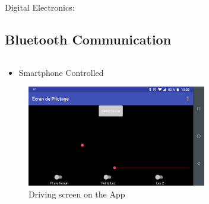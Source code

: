 \documentclass{beamer}
\begin{document}
\begin{frame}{Digital Electronics:}
		\subsection[Bluetooth]{Bluetooth Communication}
		\begin{columns}[T]
	  		\begin{column}{0.5\textwidth}
		    	\begin{itemize}
		    		\item Smartphone Controlled
		    	\end{itemize}
		    	\begin{figure}
		    		\includegraphics[width=0.8\textwidth]{../Illus/AppPilotage.png}
	    			\caption{Driving screen on the App}
	    		 \end{figure}
	  		\end{column}
	  		\begin{column}{0.5\textwidth}
	  			\begin{figure}

\end{figure}
\end{column}
\end{columns}
\end{frame}
\end{document}
